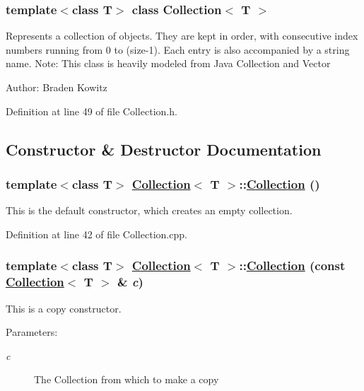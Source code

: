 \subsubsection*{template$<$class T$>$ class Collection$<$ T $>$}

Represents a collection of objects. They are kept in order, with consecutive index numbers running from 0 to (size-1). Each entry is also accompanied by a string name. Note: This class is heavily modeled from Java Collection and Vector \begin{Desc}
\item[Author:]Braden Kowitz \end{Desc}




Definition at line 49 of file Collection.h.

\subsection{Constructor \& Destructor Documentation}
\hypertarget{classCollection_a0}{
\subsubsection[Collection]{\setlength{\rightskip}{0pt plus 5cm}template$<$class T$>$ \hyperlink{classCollection}{Collection}$<$ T $>$::\hyperlink{classCollection}{Collection} ()}}
\label{classCollection_a0}


This is the default constructor, which creates an empty collection. 

Definition at line 42 of file Collection.cpp.\hypertarget{classCollection_a1}{
\subsubsection[Collection]{\setlength{\rightskip}{0pt plus 5cm}template$<$class T$>$ \hyperlink{classCollection}{Collection}$<$ T $>$::\hyperlink{classCollection}{Collection} (const \hyperlink{classCollection}{Collection}$<$ T $>$ \& {\em c})}}
\label{classCollection_a1}


This is a copy constructor. \begin{Desc}
\item[Parameters:]
\begin{description}
\item[{\em c}]The Collection from which to make a copy \end{description}
\end{Desc}


